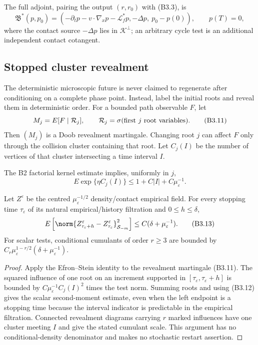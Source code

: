 The full adjoint, pairing the output $(r,r_0)$ with (B3.3), is
\[
 \mathfrak B^*(p,p_0)=
 \left(-\partial_tp-v\cdot\nabla_xp-\mathcal L_f^*p,
       -\Delta p,\ p_0-p(0)\right),\qquad p(T)=0,           \tag{B3.10}
\]
where the contact source $-\Delta p$ lies in $\mathcal K^\perp$; an arbitrary
cycle test is an additional independent contact cotangent.

\subsection{Stopped cluster revealment}

The deterministic microscopic future is never claimed to regenerate after
conditioning on a complete phase point.  Instead, label the initial roots and
reveal them in deterministic order.  For a bounded path observable $F$, let
\[
 M_j=E[F\mid\mathcal R_j],\qquad
 \mathcal R_j=\sigma(\hbox{first }j\hbox{ root variables}).              \tag{B3.11}
\]
Then $(M_j)$ is a Doob revealment martingale.  Changing root $j$ can affect
$F$ only through the collision cluster containing that root.  Let
$C_j(I)$ be the number of vertices of that cluster intersecting a time
interval $I$.

The B2 factorial kernel estimate implies, uniformly in $j$,
\[
 E\exp\{\eta C_j(I)\}\le1+C|I|+C\mu_\varepsilon^{-1}.      \tag{B3.12}
\]

\begin{lemma}
\label{lem:r29-b3-reveal}
Let $Z^\varepsilon$ be the centred
$\mu_\varepsilon^{-1/2}$ density/contact empirical field.  For every stopping
time $\tau_\varepsilon$ of its natural empirical/history filtration and
$0\le h\le\delta$,
\[
 E\left[\norm{Z^\varepsilon_{\tau_\varepsilon+h}
                  -Z^\varepsilon_{\tau_\varepsilon}}_{\mathcal S_{-m}}^2
\right]
 \le C(\delta+\mu_\varepsilon^{-1}).                       \tag{B3.13}
\]
For scalar tests, conditional cumulants of order $r\ge3$ are bounded by
$C_r\mu_\varepsilon^{1-r/2}(
\delta+\mu_\varepsilon^{-1})$.
\end{lemma}

\begin{proof}
Apply the Efron--Stein identity to the revealment martingale (B3.11).  The
squared influence of one root on an increment supported in
$[\tau_\varepsilon,\tau_\varepsilon+h]$ is bounded by
$C\mu_\varepsilon^{-1}C_j(I)^2$ times the test norm.  Summing roots and using
(B3.12) gives the scalar second-moment estimate, even when the left endpoint
is a stopping time because the interval indicator is predictable in the
empirical filtration.  Connected revealment diagrams carrying $r$ marked
influences have one cluster meeting $I$ and give the stated cumulant scale.
This argument has no conditional-density denominator and makes no stochastic
restart assertion.
\end{proof}

